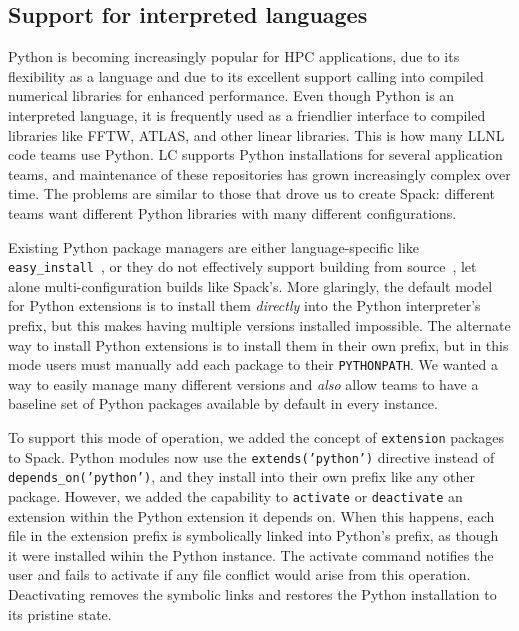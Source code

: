 
\subsection{Support for interpreted languages}
\label{sec:usecase-python}

Python is becoming increasingly popular for HPC applications, 
due to its flexibility as a language and due to its excellent support
calling into compiled numerical libraries for enhanced performance.
Even though Python is an interpreted language, it is frequently used
as a friendlier interface to compiled libraries like FFTW, ATLAS, and
other linear libraries.  This is how many LLNL code teams use Python.
%
LC supports Python installations for several application teams,
and maintenance of these repositories has grown increasingly complex over
time.  The problems are similar to those that drove us to create
Spack: different teams want different Python libraries with many different
configurations.

Existing Python package managers are either language-specific like 
{\tt easy\_install}~\cite{eby:setuptools}, 
or they do not effectively support building from source~\cite{anaconda,conda}, let
alone multi-configuration builds like Spack's.  More glaringly, the default
model for Python extensions is to install them {\it directly} into the Python
interpreter's prefix, but this makes having multiple versions installed impossible.
The alternate way to install Python extensions is to install them in their own prefix,
but in this mode users must manually add each package to their {\tt PYTHONPATH}. 
We wanted a way to  easily manage many different versions and {\it also} allow teams
to have a baseline set of Python packages available by default in every instance.

To support this mode of operation, we added the concept of {\tt extension} packages
to Spack. Python modules now use the {\tt extends('python')} directive instead of
{\tt depends\_on('python')}, and they install into their own prefix like any other
package.  However, we added the capability to {\tt activate} or {\tt deactivate} an
extension within the Python extension it depends on.  When this happens, each file
in the extension prefix is symbolically linked into Python's prefix, as though it were
installed wihin the Python instance. The activate command notifies the user and
fails to activate if any file conflict would arise from this operation.
Deactivating removes the symbolic links and restores the Python installation to its 
pristine state. 

